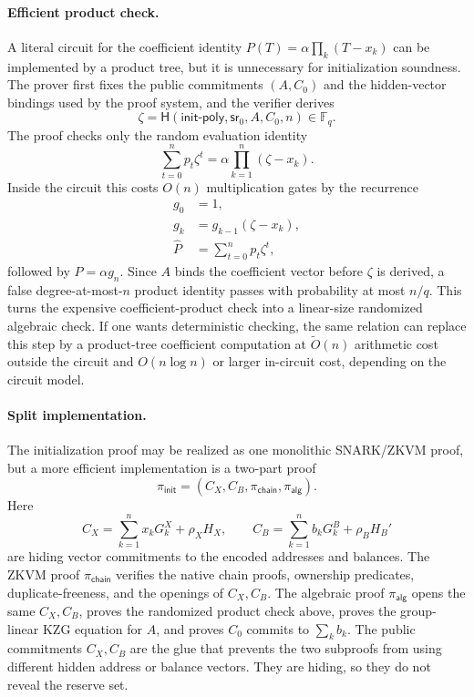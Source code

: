 \documentclass[runningheads]{llncs}
\newcommand{\F}{\mathbb{F}}
\newcommand{\sr}{\mathsf{sr}}
\newcommand{\softO}{\widetilde{O}}
\newcommand{\Hash}{\mathsf{H}}
\begin{document}
\paragraph{Efficient product check.}
A literal circuit for the coefficient identity \(P(T)=\alpha\prod_k(T-x_k)\) can be implemented by a product tree, but it is unnecessary for initialization soundness.  The prover first fixes the public commitments \((A,C_0)\) and the hidden-vector bindings used by the proof system, and the verifier derives
\[
        \zeta=\Hash(\mathsf{init\mbox{-}poly},\sr_0,A,C_0,n)\in\F_q .
\]
The proof checks only the random evaluation identity
\[
        \sum_{t=0}^n p_t\zeta^t
        =
        \alpha\prod_{k=1}^n(\zeta-x_k).
\]
Inside the circuit this costs \(O(n)\) multiplication gates by the recurrence
\[
\begin{aligned}
        g_0&=1,\\
        g_k&=g_{k-1}(\zeta-x_k),\\
        \widehat P&=\sum_{t=0}^n p_t\zeta^t,
\end{aligned}
\]
followed by \(\widehat P=\alpha g_n\).  Since \(A\) binds the coefficient vector before \(\zeta\) is derived, a false degree-at-most-\(n\) product identity passes with probability at most \(n/q\).  This turns the expensive coefficient-product check into a linear-size randomized algebraic check.  If one wants deterministic checking, the same relation can replace this step by a product-tree coefficient computation at \(\softO(n)\) arithmetic cost outside the circuit and \(O(n\log n)\) or larger in-circuit cost, depending on the circuit model.

\paragraph{Split implementation.}
The initialization proof may be realized as one monolithic SNARK/ZKVM proof, but a more efficient implementation is a two-part proof
\[
        \pi_{\mathsf{init}}=(C_X,C_B,\pi_{\mathsf{chain}},\pi_{\mathsf{alg}}).
\]
Here
\[
        C_X=\sum_{k=1}^n x_kG_k^X+\rho_XH_X,
        \qquad
        C_B=\sum_{k=1}^n b_kG_k^B+\rho_BH_B'
\]
are hiding vector commitments to the encoded addresses and balances.  The ZKVM proof \(\pi_{\mathsf{chain}}\) verifies the native chain proofs, ownership predicates, duplicate-freeness, and the openings of \(C_X,C_B\).  The algebraic proof \(\pi_{\mathsf{alg}}\) opens the same \(C_X,C_B\), proves the randomized product check above, proves the group-linear KZG equation for \(A\), and proves \(C_0\) commits to \(\sum_kb_k\).  The public commitments \(C_X,C_B\) are the glue that prevents the two subproofs from using different hidden address or balance vectors.  They are hiding, so they do not reveal the reserve set.
\end{document}
